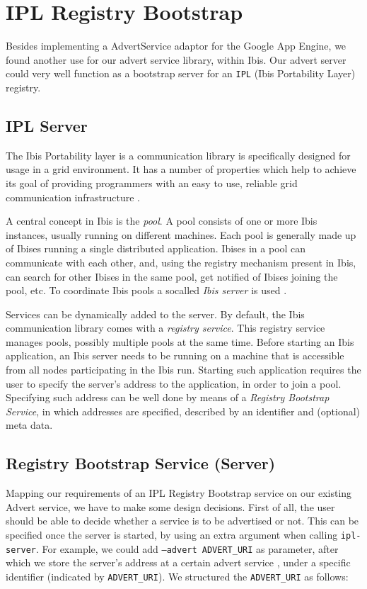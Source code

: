 \section{IPL Registry Bootstrap}
\label{ipl}
Besides implementing a AdvertService adaptor for the Google App Engine, we
found another use for our advert service library, within Ibis. Our advert
server could very well function as a bootstrap server for an \texttt{IPL} (Ibis
Portability Layer) \cite{ipl-www} registry.

\subsection{IPL Server}
The Ibis Portability layer is a communication library is specifically
designed for usage in a grid environment. It has a number of properties which
help to achieve its goal of providing programmers with an easy to use, reliable
grid communication infrastructure \cite{ipl-www}.

A central concept in Ibis is the \emph{pool}. A pool consists of one or more Ibis
instances, usually running on different machines. Each pool is generally made up
of Ibises running a single distributed application. Ibises in a pool can
communicate with each other, and, using the registry mechanism present in Ibis,
can search for other Ibises in the same pool, get notified of Ibises joining the
pool, etc. To coordinate Ibis pools a socalled \emph{Ibis server} is used
\cite{ipl-usersguide}.

Services can be dynamically added to the server. By default, the Ibis
communication library comes with a \emph{registry service}. This registry
service manages pools, possibly multiple pools at the same time. Before starting
an Ibis application, an Ibis server needs to be running on a machine that is
accessible from all nodes participating in the Ibis run. Starting such
application requires the user to specify the server's address to the
application, in order to join a pool. Specifying such address can be well done
by means of a \emph{Registry Bootstrap Service}, in which addresses are
specified, described by an identifier and (optional) meta data.

\subsection{Registry Bootstrap Service (Server)}
Mapping our requirements of an IPL Registry Bootstrap service on our existing
Advert service, we have to make some design decisions. First of all, the user
should be able to decide whether a service is to be advertised or not. This can
be specified once the server is started, by using an extra argument when calling
\texttt{ipl-server}. For example, we could add \texttt{--advert ADVERT\_URI} as
parameter, after which we store the server's address at a certain advert service
, under a specific identifier (indicated by \texttt{ADVERT\_URI}). We structured
the \texttt{ADVERT\_URI} as follows:

